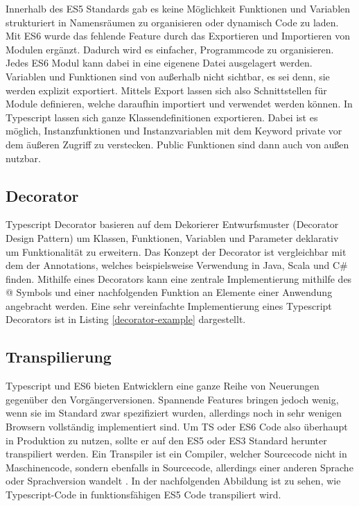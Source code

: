 Innerhalb des ES5 Standards gab es keine Möglichkeit Funktionen und Variablen strukturiert in Namensräumen zu organisieren oder dynamisch Code zu laden.
Mit ES6 wurde das fehlende Feature durch das Exportieren und Importieren von Modulen ergänzt. Dadurch wird es einfacher, Programmcode zu organisieren.
Jedes ES6 Modul kann dabei in eine eigenene Datei ausgelagert werden. Variablen und Funktionen sind von außerhalb nicht sichtbar, es sei denn, sie werden explizit exportiert.
Mittels Export lassen sich also Schnittstellen für Module definieren, welche daraufhin importiert und verwendet werden können.
In Typescript lassen sich ganze Klassendefinitionen exportieren.
Dabei ist es möglich, Instanzfunktionen und Instanzvariablen mit dem Keyword private vor dem äußeren Zugriff zu verstecken.
Public Funktionen sind dann auch von außen nutzbar.



\subsection{Decorator}

Typescript Decorator basieren auf dem Dekorierer Entwurfsmuster (Decorator Design Pattern) um Klassen,
Funktionen, Variablen und Parameter deklarativ um Funktionalität zu erweitern.
Das Konzept der Decorator ist vergleichbar mit dem der Annotations, welches beispielsweise Verwendung in Java, Scala und C\#
finden.
Mithilfe eines Decorators kann eine zentrale Implementierung
mithilfe des @ Symbols und einer nachfolgenden Funktion an Elemente einer Anwendung angebracht werden.
Eine sehr vereinfachte Implementierung eines Typescript Decorators ist in Listing \ref{decorator-example} dargestellt.

\vspace{0.3cm}

\vspace{0.3cm}


\subsection{Transpilierung}

Typescript und ES6 bieten Entwicklern eine ganze Reihe von Neuerungen gegenüber den Vorgängerversionen.
Spannende Features bringen jedoch wenig, wenn sie im Standard zwar spezifiziert wurden,
allerdings noch in sehr wenigen Browsern vollständig implementiert sind.
Um TS oder ES6 Code also überhaupt in Produktion zu nutzen, sollte er auf den ES5 oder ES3
Standard herunter transpiliert werden.
Ein Transpiler ist ein Compiler, welcher Sourcecode nicht in Maschinencode, sondern ebenfalls in Sourcecode,
allerdings einer anderen Sprache oder Sprachversion wandelt \cite{Introduction-to-the-Typescript-Transpiler}.
In der nachfolgenden Abbildung ist zu sehen, wie Typescript-Code in funktionsfähigen ES5 Code transpiliert wird.

